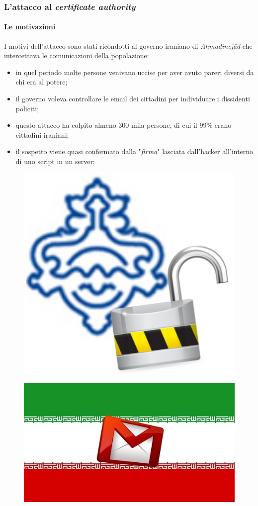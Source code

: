 \documentclass{beamer}
\begin{document}
\begin{frame}
\frametitle{L'attacco al \textit{certificate authority}}
\framesubtitle{Le motivazioni}
I motivi dell'attacco sono stati ricondotti al \alert{governo iraniano} di \textit{Ahmadinejād} che intercettava le comunicazioni della popolazione:
\begin{itemize}
	\item in quel periodo molte persone venivano uccise per aver avuto pareri diversi da chi era al potere;
	\item il governo voleva \alert{controllare} le \alert{email} dei cittadini per individuare i \alert{dissidenti policiti};
	\item questo attacco ha colpito almeno 300 mila persone, di cui il 99\% erano cittadini iraniani;
	\item il sospetto viene quasi confermato dalla "\alert{\textit{firma}}" lasciata dall'\alert{hacker} all'interno di uno \alert{script} in un server;
\end{itemize}
\begin{multicols}{2}
\begin{figure}[H]
	\centering
	\includegraphics[scale=0.07]{diginotar1}
\end{figure}
\columnbreak
\begin{figure}[H]
	\centering
	\includegraphics[scale=0.6]{irangmail}

\end{figure}
\end{multicols}
\end{frame}
\end{document}
